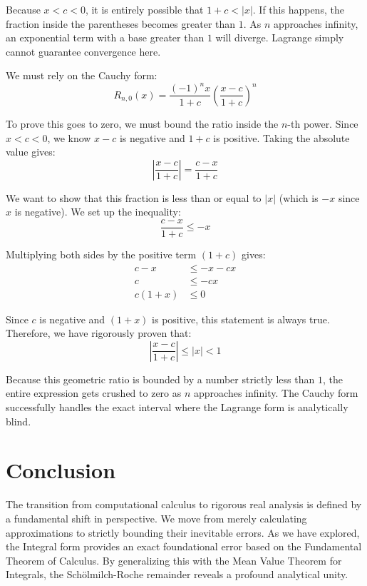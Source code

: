 \documentclass[12pt, a4paper]{article}
\theoremstyle{definition}
\theoremstyle{remark}
\begin{document}
Because $x < c < 0$, it is entirely possible that $1+c < |x|$. If this happens, the fraction inside the parentheses becomes greater than $1$. As $n$ approaches infinity, an exponential term with a base greater than $1$ will diverge. Lagrange simply cannot guarantee convergence here.

We must rely on the Cauchy form:
\begin{equation*}
    R_{n,0}(x) = \frac{(-1)^n x}{1+c} \left( \frac{x-c}{1+c} \right)^n
\end{equation*}

To prove this goes to zero, we must bound the ratio inside the $n$-th power. Since $x < c < 0$, we know $x-c$ is negative and $1+c$ is positive. Taking the absolute value gives:
\begin{equation*}
    \left| \frac{x-c}{1+c} \right| = \frac{c-x}{1+c}
\end{equation*}

We want to show that this fraction is less than or equal to $|x|$ (which is $-x$ since $x$ is negative). We set up the inequality:
\begin{equation*}
    \frac{c-x}{1+c} \le -x
\end{equation*}

Multiplying both sides by the positive term $(1+c)$ gives:
\begin{align*}
    c - x &\le -x - cx \\
    c &\le -cx \\
    c(1+x) &\le 0
\end{align*}

Since $c$ is negative and $(1+x)$ is positive, this statement is always true. Therefore, we have rigorously proven that:
\begin{equation*}
    \left| \frac{x-c}{1+c} \right| \le |x| < 1
\end{equation*}

Because this geometric ratio is bounded by a number strictly less than $1$, the entire expression gets crushed to zero as $n$ approaches infinity. The Cauchy form successfully handles the exact interval where the Lagrange form is analytically blind.

\section{Conclusion}
The transition from computational calculus to rigorous real analysis is defined by a fundamental shift in perspective. We move from merely calculating approximations to strictly bounding their inevitable errors. As we have explored, the Integral form provides an exact foundational error based on the Fundamental Theorem of Calculus. By generalizing this with the Mean Value Theorem for Integrals, the Schölmilch-Roche remainder reveals a profound analytical unity.
\end{document}
